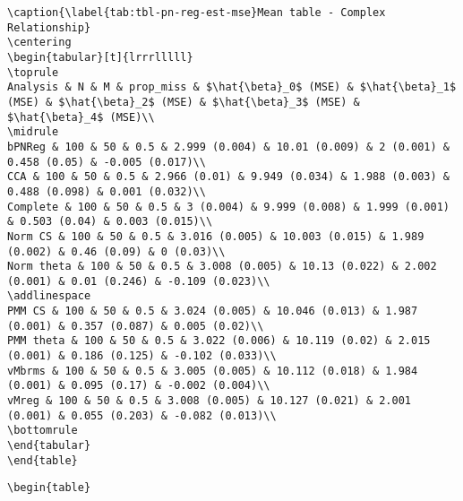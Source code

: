 \documentclass[
]{article}
\begin{document}
\begin{table}
\begin{minipage}[t]{\linewidth}
{\begin{verbatim}
\caption{\label{tab:tbl-pn-reg-est-mse}Mean table - Complex Relationship}
\centering
\begin{tabular}[t]{lrrrlllll}
\toprule
Analysis & N & M & prop_miss & $\hat{\beta}_0$ (MSE) & $\hat{\beta}_1$ (MSE) & $\hat{\beta}_2$ (MSE) & $\hat{\beta}_3$ (MSE) & $\hat{\beta}_4$ (MSE)\\
\midrule
bPNReg & 100 & 50 & 0.5 & 2.999 (0.004) & 10.01 (0.009) & 2 (0.001) & 0.458 (0.05) & -0.005 (0.017)\\
CCA & 100 & 50 & 0.5 & 2.966 (0.01) & 9.949 (0.034) & 1.988 (0.003) & 0.488 (0.098) & 0.001 (0.032)\\
Complete & 100 & 50 & 0.5 & 3 (0.004) & 9.999 (0.008) & 1.999 (0.001) & 0.503 (0.04) & 0.003 (0.015)\\
Norm CS & 100 & 50 & 0.5 & 3.016 (0.005) & 10.003 (0.015) & 1.989 (0.002) & 0.46 (0.09) & 0 (0.03)\\
Norm theta & 100 & 50 & 0.5 & 3.008 (0.005) & 10.13 (0.022) & 2.002 (0.001) & 0.01 (0.246) & -0.109 (0.023)\\
\addlinespace
PMM CS & 100 & 50 & 0.5 & 3.024 (0.005) & 10.046 (0.013) & 1.987 (0.001) & 0.357 (0.087) & 0.005 (0.02)\\
PMM theta & 100 & 50 & 0.5 & 3.022 (0.006) & 10.119 (0.02) & 2.015 (0.001) & 0.186 (0.125) & -0.102 (0.033)\\
vMbrms & 100 & 50 & 0.5 & 3.005 (0.005) & 10.112 (0.018) & 1.984 (0.001) & 0.095 (0.17) & -0.002 (0.004)\\
vMreg & 100 & 50 & 0.5 & 3.008 (0.005) & 10.127 (0.021) & 2.001 (0.001) & 0.055 (0.203) & -0.082 (0.013)\\
\bottomrule
\end{tabular}
\end{table}
\end{verbatim}

}

\end{minipage}%
\newline
\begin{minipage}[t]{\linewidth}

{\centering 

\begin{verbatim}
\begin{table}


\end{verbatim}}
\end{minipage}
\end{table}
\end{document}
